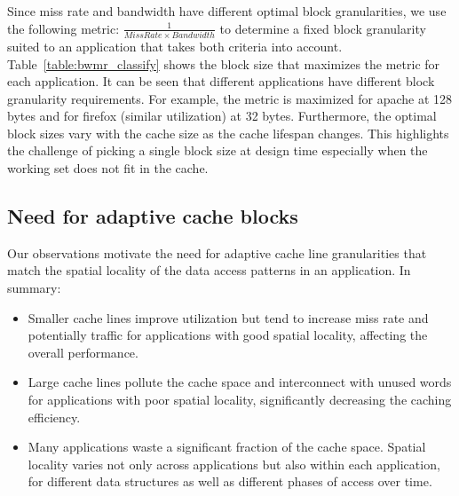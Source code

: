 


Since miss rate and bandwidth have different optimal block
granularities, we use the following metric: $\frac{1}{Miss Rate \times
  Bandwidth}$ to determine a fixed block granularity suited to an
application that takes both criteria into account.
Table~\ref{table:bwmr_classify} shows the block size that maximizes
the metric for each application.  It can be seen that different
applications have different block granularity requirements.  For
example, the metric is maximized for apache at 128 bytes and for
firefox (similar utilization) at 32 bytes.  Furthermore, the optimal
block sizes vary with the cache size as the cache lifespan
changes. This highlights the challenge of picking a single block size
at design time especially when the working set does not fit in the
cache.

\subsection{Need for adaptive cache blocks}
Our observations motivate the need for adaptive cache line
granularities that match the spatial locality of the data access patterns
in an application. In summary:
\begin{itemize}
  \item  Smaller cache lines improve utilization but tend to increase
    miss rate and potentially traffic for applications with good
    spatial locality, affecting the overall performance.
  \item Large cache lines pollute the cache space and interconnect
    with unused words for applications with poor spatial locality, 
   significantly decreasing the caching efficiency.
  \item Many applications waste a significant fraction of the cache
  space. Spatial locality varies not only across applications but also
  within each application, for different data structures as well as 
  different phases of access over time.   

\end{itemize}


